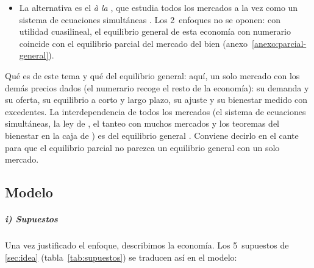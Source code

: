 \documentclass[11pt]{article}
\begin{document}
\begin{itemize}
  \begin{itemize}
  \item por el lado de los consumidores, las preferencias son  respecto al numerario, de modo que no hay efectos renta en la demanda del bien;
  \item por el lado de las empresas, la tecnología transforma numerario en el bien según una función de costes que da el coste mínimo de cada cantidad con los precios de los factores dados: el mercado de factores tampoco se ve afectado.
  \end{itemize}
\item La alternativa es el  \emph{à la} , que estudia todos los mercados a la vez como un sistema de ecuaciones simultáneas . Los 2~enfoques no se oponen: con utilidad cuasilineal, el equilibrio general de esta economía con numerario coincide con el equilibrio parcial del mercado del bien (anexo~\ref{anexo:parcial-general}).
\end{itemize}

\begin{notaopositor}
Qué es de este tema y qué del equilibrio general: aquí, un solo mercado con los demás precios dados (el numerario recoge el resto de la economía): su demanda y su oferta, su equilibrio a corto y largo plazo, su ajuste y su bienestar medido con excedentes. La interdependencia de todos los mercados (el sistema de ecuaciones simultáneas, la ley de , el tanteo con muchos mercados y los teoremas del bienestar en la caja de ) es del equilibrio general . Conviene decirlo en el cante para que el equilibrio parcial no parezca un equilibrio general con un solo mercado.
\end{notaopositor}

\subsection{Modelo}\label{sec:modelo}

\subparagraph{i) Supuestos}

Una vez justificado el enfoque, describimos la economía. Los 5~supuestos de \ref{sec:idea} (tabla~\ref{tab:supuestos}) se traducen así en el modelo:
\end{document}
